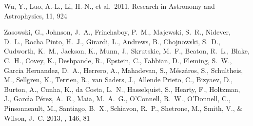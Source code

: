 \documentclass[12pt, preprint]{aastex}
\begin{document}
\begin{thebibliography}{24}
 Wu, Y., Luo, A.-L., Li, 
H.-N., et al.\ 2011, Research in Astronomy and Astrophysics, 11, 924 

{Zasowski}, G., {Johnson}, J.~A., {Frinchaboy}, P.~M., {Majewski}, S.~R.,
  {Nidever}, D.~L., {Rocha Pinto}, H.~J., {Girardi}, L., {Andrews}, B.,
  {Chojnowski}, S.~D., {Cudworth}, K.~M., {Jackson}, K., {Munn}, J.,
  {Skrutskie}, M.~F., {Beaton}, R.~L., {Blake}, C.~H., {Covey}, K.,
  {Deshpande}, R., {Epstein}, C., {Fabbian}, D., {Fleming}, S.~W., {Garcia
  Hernandez}, D.~A., {Herrero}, A., {Mahadevan}, S., {M{\'e}sz{\'a}ros}, S.,
  {Schultheis}, M., {Sellgren}, K., {Terrien}, R., {van Saders}, J., {Allende
  Prieto}, C., {Bizyaev}, D., {Burton}, A., {Cunha}, K., {da Costa}, L.~N.,
  {Hasselquist}, S., {Hearty}, F., {Holtzman}, J., {Garc{\'{\i}}a P{\'e}rez},
  A.~E., {Maia}, M.~A.~G., {O'Connell}, R.~W., {O'Donnell}, C., {Pinsonneault},
  M., {Santiago}, B.~X., {Schiavon}, R.~P., {Shetrone}, M., {Smith}, V., \&
  {Wilson}, J.~C. 2013, \aj, 146, 81

\end{thebibliography}
\end{document}
